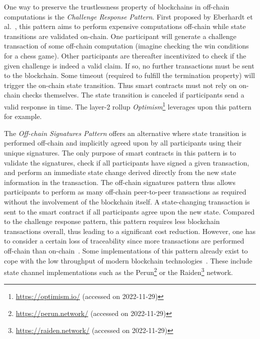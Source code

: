 One way to preserve the trustlessness property of blockchains in off-chain computations is the \textit{Challenge Response Pattern}. First proposed by Eberhardt et al.~\cite{eberhardt17off_block}, this pattern aims to perform expensive computations off-chain while state transitions are validated on-chain. One participant will generate a challenge transaction of some off-chain computation (imagine checking the win conditions for a chess game). Other participants are thereafter incentivized to check if the given challenge is indeed a valid claim. If so, no further transactions must be sent to the blockchain. Some timeout (required to fulfill the termination property) will trigger the on-chain state transition. Thus smart contracts must not rely on on-chain checks themselves. The state transition is canceled if participants send a valid response in time. The layer-2 rollup \textit{Optimism}\footnote{\url{https://optimism.io/} (accessed on 2022-11-29)} leverages upon this pattern for example.

The \textit{Off-chain Signatures Pattern} offers an alternative where state transition is performed off-chain and implicitly agreed upon by all participants using their unique signatures. The only purpose of smart contracts in this pattern is to validate the signatures, check if all participants have signed a given transaction, and perform an immediate state change derived directly from the new state information in the transaction. The off-chain signatures pattern thus allows participants to perform as many off-chain peer-to-peer transactions as required without the involvement of the blockchain itself. A state-changing transaction is sent to the smart contract if all participants agree upon the new state. Compared to the challenge response pattern, this pattern requires less blockchain transactions overall, thus leading to a significant cost reduction. However, one has to consider a certain loss of traceability since more transactions are performed off-chain than on-chain~\cite{eberhardt17off_block, eberhardt18off_model_approac_off_comput}. Some implementations of this pattern already exist to cope with the low throughput of modern blockchain technologies~\cite{taxonomy_of_blockchain_based_systems}. These include state channel implementations such as the Perun\footnote{\url{https://perun.network/} (accessed on 2022-11-29)} or the Raiden\footnote{\url{https://raiden.network/} (accessed on 2022-11-29)} network.


